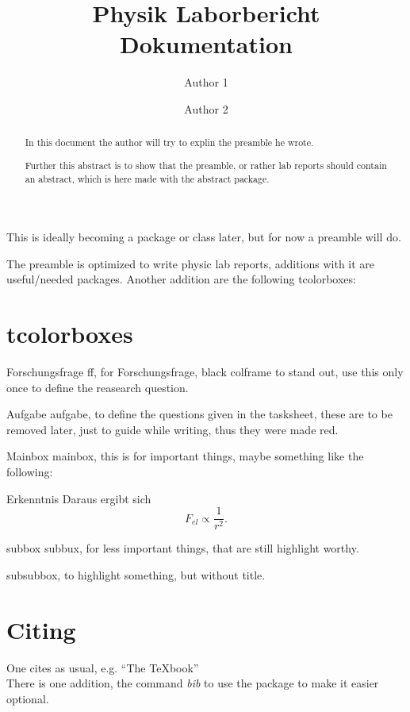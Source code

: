 \documentclass[twocolumn]{article}
\author[1]{Author 1}
\author[2]{Author 2}
\affil[1]{Author institution}
\affil[2]{Another Author's institution}
\title{Physik Laborbericht Dokumentation}
\date{}
\begin{document}
\maketitle


\begin{abstract}
  In this document the author will try to explin the preamble he wrote.

  Further this abstract is to show that the preamble, or rather lab reports
  should contain an abstract, which is here made with the abstract package.
\end{abstract}

This is ideally becoming a package or class later, but for now a preamble will do.

The preamble is optimized to write physic lab reports, additions with it are
useful/needed packages. Another addition are the following tcolorboxes:
    



\section{tcolorboxes}
\label{sec:tcol}


\begin{ff}{Forschungsfrage}
    ff, for Forschungsfrage, black colframe to stand out, use this only once to define the reasearch question.
\label{Forschungsfrage}
\end{ff}


\begin{aufgabe}{Aufgabe}
    aufgabe, to define the questions given in the tasksheet, these are to be
    removed later, just to guide while writing, thus they were made red.
\label{aufgabe-1}
\end{aufgabe}


\begin{mainbox}{Mainbox}
    mainbox, this is for important things, maybe something like the following:

\begin{mainbox}{Erkenntnis}
    Daraus ergibt sich
    \[ F_{el} \propto \frac{1}{r^2} .\] 
\end{mainbox}
\end{mainbox}


\begin{subbox}{subbox}
    subbux, for less important things, that are still highlight worthy.
\end{subbox}

\begin{subsubbox}
    subsubbox, to highlight something, but without title.
\end{subsubbox}




\section{Citing}
One cites as usual, e.g. ``The \TeX{}book''~\cite{knuth1986texbook}\\
There is one addition, the command \textit{bib} to use the package to make it easier optional.




\vfill
\printbibliography
\end{document}
